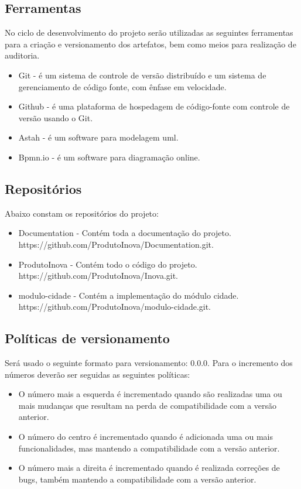 \documentclass{article}
\begin{document}
    	\subsection{Ferramentas}
        No ciclo de desenvolvimento do projeto serão utilizadas as seguintes ferramentas para a criação e versionamento dos artefatos, bem como meios para realização de auditoria.
        \begin{itemize}
          \item Git - é um sistema de controle de versão distribuído e um sistema de gerenciamento de código fonte, com ênfase em velocidade. 
          \item Github - é uma plataforma de hospedagem de código-fonte com controle de versão usando o Git.
          \item Astah - é um software para modelagem uml. 
          \item Bpmn.io - é um software para diagramação online.
        \end{itemize}
         \subsection{Repositórios}
         Abaixo constam os repositórios do projeto:
	         \begin{itemize}
		         \item Documentation - Contém toda a documentação do projeto. https://github.com/ProdutoInova/Documentation.git.
		         \item ProdutoInova - Contém todo o código do projeto. https://github.com/ProdutoInova/Inova.git.
		         \item modulo-cidade - Contém a implementação do módulo cidade. https://github.com/ProdutoInova/modulo-cidade.git.
		      \end{itemize}
        \subsection{Políticas de versionamento}
        Será usado o seguinte formato para versionamento: 0.0.0. Para o incremento dos números deverão ser seguidas as seguintes políticas:
        \begin{itemize}
        	\item O número mais a esquerda é incrementado quando são realizadas uma ou mais mudanças que resultam na perda de compatibilidade com a versão anterior.
			\item O número do centro é incrementado quando é adicionada uma ou mais funcionalidades, mas mantendo a compatibilidade com a versão anterior. 
			\item O número mais a direita é incrementado quando é realizada correções de bugs, também mantendo a compatibilidade com a versão anterior. 
		\end{itemize}
\end{document}
